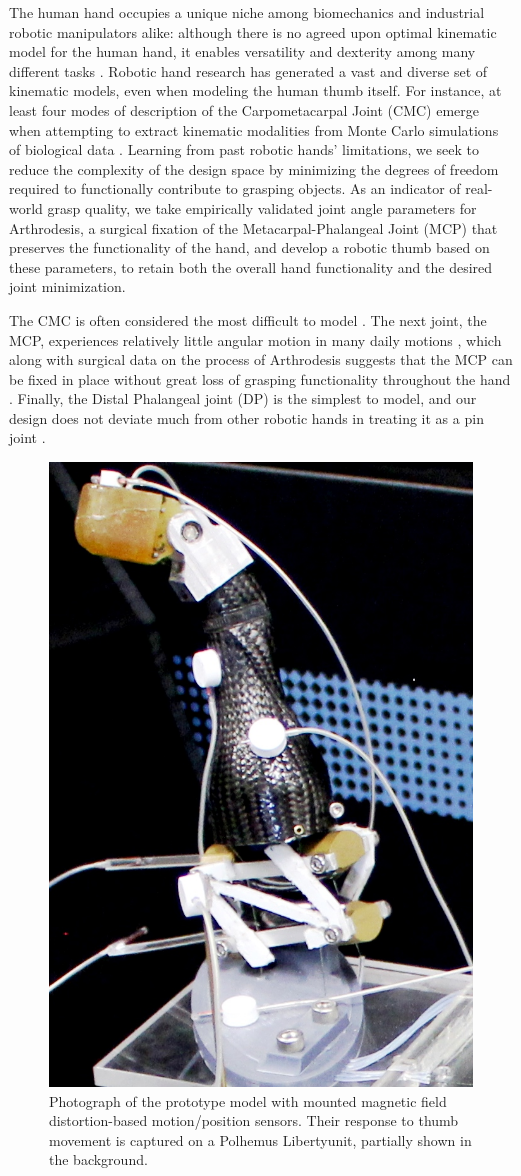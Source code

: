 \documentclass[letterpaper, 10 pt, conference]{ieeeconf}
\begin{document}
The human hand occupies a unique niche among biomechanics and industrial robotic manipulators alike: although there is no agreed upon optimal kinematic model for the human hand, it enables versatility and dexterity among many different tasks \cite{vfingers} \cite{ss}. Robotic hand research has generated a vast and diverse set of kinematic models, even when modeling the human thumb itself. For instance, at least four modes of description of the Carpometacarpal Joint (CMC) emerge when attempting to extract kinematic modalities from Monte Carlo simulations of biological data \cite{santos2006reported} \cite{niehues} \cite{nana}. Learning from past robotic hands' limitations, we seek to reduce the complexity of the design space by minimizing the degrees of freedom required to functionally contribute to grasping objects. As an indicator of real-world grasp quality, we take empirically validated joint angle parameters for Arthrodesis, a surgical fixation of the Metacarpal-Phalangeal Joint (MCP) that preserves the functionality of the hand, and develop a robotic thumb based on these parameters, to retain both the overall hand functionality and the desired joint minimization.

The CMC is often considered the most difficult to model \cite{santos2006reported}. The next joint, the MCP, experiences relatively little angular motion in many daily motions \cite{steiger}, which along with surgical data on the process of Arthrodesis suggests that the MCP can be fixed in place without great loss of grasping functionality throughout the hand \cite{biorob}. Finally, the Distal Phalangeal joint (DP) is the simplest to model, and our design does not deviate much from other robotic hands in treating it as a pin joint \cite{iCub} \cite{pisahand}.


\begin{figure}
	\centering
	\includegraphics[width = .5\columnwidth]{Figures/f1.jpg}
	\caption{Photograph of the prototype model with mounted magnetic field distortion-based motion/position sensors. Their response to thumb movement is captured on a Polhemus Liberty\texttrademark \medspace unit, partially shown in the background. }\label{thumbphoto}
	\vspace{-15pt}
\end{figure}
\end{document}
